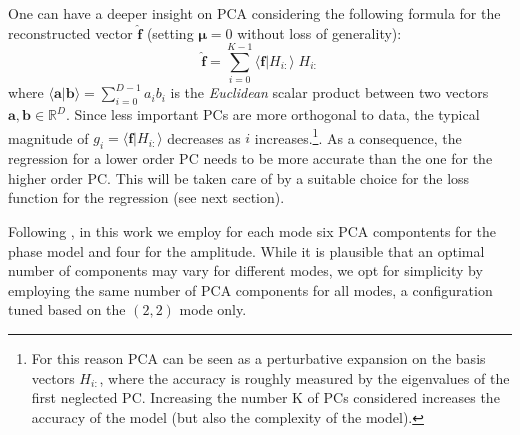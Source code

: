 \documentclass[twocolumn,showpacs,preprintnumbers,nofootinbib,prd,
superscriptaddress,10pt]{revtex4-2}
\newcommand{\R}{\mathbb{R}}
\begin{document}
One can have a deeper insight on PCA considering the following formula for the reconstructed vector $\hat{\mathbf{f}}$ (setting $\boldsymbol{\mu}=0$ without loss of generality):
\begin{equation} \label{eq:perturbative_exp}
	\hat{\mathbf{f}} = \sum_{i=0}^{K-1} \langle \mathbf{f} | H_{i:} \rangle \; H_{i:}
\end{equation}
%
where $\langle \mathbf{a} | \mathbf{b} \rangle = \sum_{i=0}^{D-1} a_i b_i$ is the {\it Euclidean} scalar product between two vectors $\mathbf{a}, \mathbf{b} \in \R^D$.
%
Since less important PCs are more orthogonal to data, the typical magnitude of $g_i = \langle \mathbf{f} | H_{i:} \rangle$ decreases as $i$ increases.\footnote{For this reason PCA can be seen as a perturbative expansion on the basis vectors $H_{i:}$, where the accuracy is roughly measured by the eigenvalues of the first neglected PC. Increasing the number K of PCs considered increases the accuracy of the model (but also the complexity of the model).}.
As a consequence, the regression for a lower order PC needs to be more accurate than the one for the higher order PC. This will be taken care of by a suitable choice for the loss function for the regression (see next section).

Following \cite{Schmidt:2020yuu}, in this work we employ for each mode six PCA compontents for the phase model and four for the amplitude.
While it is plausible that an optimal number of components may vary for different modes, we opt for simplicity by employing the same number of PCA components for all modes, a configuration tuned based on the $(2,2)$ mode only.
\end{document}
